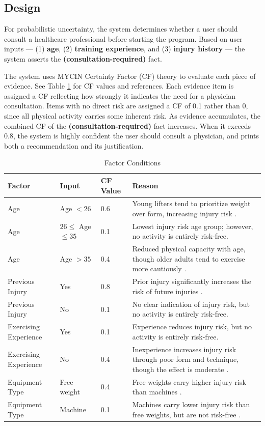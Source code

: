 \documentclass{article}
\begin{document}
\subsection{Design}

For probabilistic uncertainty, the system determines whether a user should consult a healthcare professional before starting the program. Based on user inputs — (1) \textbf{age}, (2) \textbf{training experience}, and (3) \textbf{injury history} — the system asserts the \textbf{(consultation-required)} fact.

The system uses MYCIN Certainty Factor (CF) theory to evaluate each piece of evidence. See Table \ref{tab:factors} for CF values and references. Each evidence item is assigned a CF reflecting how strongly it indicates the need for a physician consultation. Items with no direct risk are assigned a CF of 0.1 rather than 0, since all physical activity carries some inherent risk. As evidence accumulates, the combined CF of the \textbf{(consultation-required)} fact increases. When it exceeds 0.8, the system is highly confident the user should consult a physician, and prints both a recommendation and its justification.


\begin{table}[h]
\centering
\begin{tabular}{|p{4cm}|p{3cm}|p{2cm}|p{5cm}|}
\hline
\textbf{Factor} & \textbf{Input} & \textbf{CF Value} & \textbf{Reason} \\
\hline
Age & Age $< 26$ & 0.6 & Young lifters tend to prioritize weight over form, increasing injury risk \cite{youngAdultInjuries}. \\
\hline
Age & $ 26 \leq$ Age $\leq 35$ & 0.1 & Lowest injury risk age group; however, no activity is entirely risk-free. \\
\hline
Age & Age $>35$ & 0.4 & Reduced physical capacity with age, though older adults tend to exercise more cautiously \cite{injuryFactors}. \\
\hline
Previous Injury & Yes & 0.8 & Prior injury significantly increases the risk of future injuries \cite{previousInjuries}. \\
\hline
Previous Injury & No & 0.1 & No clear indication of injury risk, but no activity is entirely risk-free. \\
\hline
Exercising Experience & Yes & 0.1 & Experience reduces injury risk, but no activity is entirely risk-free. \\
\hline
Exercising Experience & No & 0.4 & Inexperience increases injury risk through poor form and technique, though the effect is moderate \cite{injuryFactors}. \\
\hline
Equipment Type & Free weight & 0.4 & Free weights carry higher injury risk than machines \cite{freeweight-risks}. \\
\hline
Equipment Type & Machine & 0.1 & Machines carry lower injury risk than free weights, but are not risk-free \cite{freeweight-risks}. \\
\hline
\end{tabular}
\caption{Factor Conditions}
\label{tab:factors}
\end{table}
\end{document}
